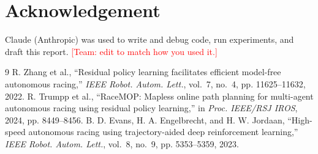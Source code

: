 \documentclass[conference]{IEEEtran}
\newcommand{\todo}[1]{\textcolor{red}{[#1]}}
\begin{document}
\section*{Acknowledgement}
Claude (Anthropic) was used to write and debug code, run experiments, and draft this report. \todo{Team: edit to
match how you used it.}

\begin{thebibliography}{9}
 R. Zhang et al., ``Residual policy learning facilitates efficient model-free autonomous
racing,'' \emph{IEEE Robot. Autom. Lett.}, vol.~7, no.~4, pp. 11625--11632, 2022.
 R. Trumpp et al., ``RaceMOP: Mapless online path planning for multi-agent autonomous racing
using residual policy learning,'' in \emph{Proc. IEEE/RSJ IROS}, 2024, pp. 8449--8456.
 B. D. Evans, H. A. Engelbrecht, and H. W. Jordaan, ``High-speed autonomous racing using
trajectory-aided deep reinforcement learning,'' \emph{IEEE Robot. Autom. Lett.}, vol.~8, no.~9, pp. 5353--5359,
2023.
\end{thebibliography}
\end{document}
